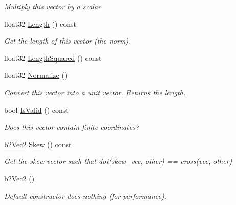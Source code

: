 \begin{DoxyCompactItemize}
\begin{DoxyCompactList}\small\item\em Multiply this vector by a scalar. \end{DoxyCompactList}\item 
\mbox{\label{structb2Vec2_a04cb9ac9e845a59f4212b2d7149fa3d9}} 
float32 \hyperlink{structb2Vec2_a04cb9ac9e845a59f4212b2d7149fa3d9}{Length} () const
\begin{DoxyCompactList}\small\item\em Get the length of this vector (the norm). \end{DoxyCompactList}\item 
float32 \hyperlink{structb2Vec2_af8a081dac7eea7800fdbfbf95ac9e395}{Length\+Squared} () const
\item 
\mbox{\label{structb2Vec2_adda78c92f318fe53d8a53f9b5cfd8e41}} 
float32 \hyperlink{structb2Vec2_adda78c92f318fe53d8a53f9b5cfd8e41}{Normalize} ()
\begin{DoxyCompactList}\small\item\em Convert this vector into a unit vector. Returns the length. \end{DoxyCompactList}\item 
\mbox{\label{structb2Vec2_abad59bf9a0269f02cda9dc919592c0ee}} 
bool \hyperlink{structb2Vec2_abad59bf9a0269f02cda9dc919592c0ee}{Is\+Valid} () const
\begin{DoxyCompactList}\small\item\em Does this vector contain finite coordinates? \end{DoxyCompactList}\item 
\mbox{\label{structb2Vec2_aaf36e082a20368b24edb635511872a74}} 
\hyperlink{structb2Vec2}{b2\+Vec2} \hyperlink{structb2Vec2_aaf36e082a20368b24edb635511872a74}{Skew} () const
\begin{DoxyCompactList}\small\item\em Get the skew vector such that dot(skew\+\_\+vec, other) == cross(vec, other) \end{DoxyCompactList}\item 
\mbox{\label{structb2Vec2_a9171b31deb83af96872f99689939a12f}} 
\hyperlink{structb2Vec2_a9171b31deb83af96872f99689939a12f}{b2\+Vec2} ()
\begin{DoxyCompactList}\small\item\em Default constructor does nothing (for performance). \end{DoxyCompactList}\item 

\end{DoxyCompactItemize}
